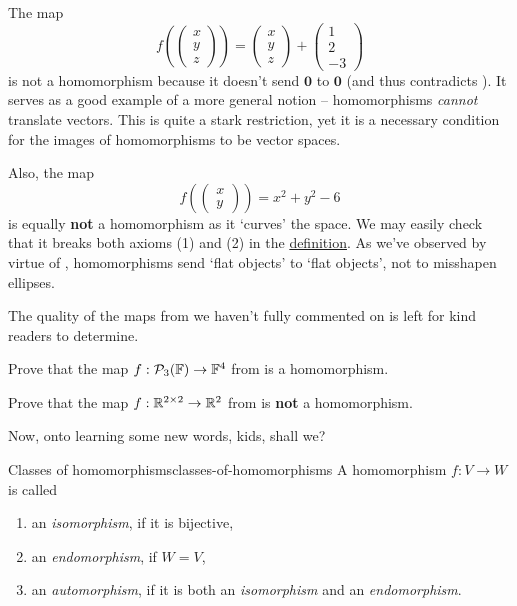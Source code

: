 The map
\[
 f \left( 
 \begin{pmatrix}
  x\\
  y\\
  z
 \end{pmatrix}
 \right) = 
 \begin{pmatrix}
  x\\
  y\\
  z
 \end{pmatrix}
 +
 \begin{pmatrix}
  1\\
  2\\
  -3
 \end{pmatrix}
\]
is not a homomorphism because it doesn't send $\mathbf{0}$ to $\mathbf{0}$ (and
thus contradicts ). It serves as a good example
of a more general notion -- homomorphisms \emph{cannot} translate vectors. This
is quite a stark restriction, yet it is a necessary condition for the images of
homomorphisms to be vector spaces.

Also, the map
\[
 f \left( 
  \begin{pmatrix}
   x\\
   y
  \end{pmatrix}
 \right) = x^2 + y^2 - 6
\]
is equally \textbf{not} a homomorphism as it `curves' the space. We may easily
check that it breaks both axioms (1) and (2) in the
\hyperref[def:homomorphism]{definition}. As we've observed by virtue of
, homomorphisms send `flat objects' to
`flat objects', not to misshapen ellipses.

The quality of the maps from  we haven't fully
commented on is left for kind readers to determine.

\begin{exercise}{}{}
 Prove that the map $f:\mathcal{P}_3(\mathbb{F}) \to \mathbb{F}^{4}$ from
  is a homomorphism.
\end{exercise}

\begin{exercise}{}{}
 Prove that the map $f:\mathbb{R}^{2 \times 2} \to \mathbb{R}^2$ from 
 is \textbf{not} a homomorphism.
\end{exercise}

Now, onto learning some new words, kids, shall we?

\begin{definition}{Classes of homomorphisms}{classes-of-homomorphisms}
 A homomorphism $f:V \to W$ is called
 \begin{enumerate}
  \item an \emph{isomorphism}, if it is bijective,
  \item an \emph{endomorphism}, if $W = V$,
  \item an \emph{automorphism}, if it is both an \emph{isomorphism} and an
   \emph{endomorphism}.
 \end{enumerate}
\end{definition}

